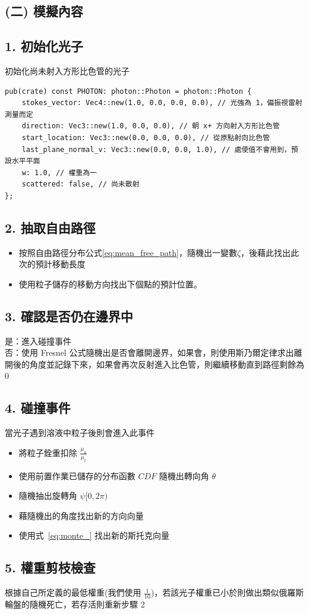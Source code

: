 \subsection*{(二) 模擬內容}
\subsection*{1. 初始化光子}
初始化尚未射入方形比色管的光子

\begin{verbatim}
pub(crate) const PHOTON: photon::Photon = photon::Photon {
    stokes_vector: Vec4::new(1.0, 0.0, 0.0, 0.0), // 光強為 1，偏振視雷射測量而定
    direction: Vec3::new(1.0, 0.0, 0.0), // 朝 x+ 方向射入方形比色管
    start_location: Vec3::new(0.0, 0.0, 0.0), // 從原點射向比色管
    last_plane_normal_v: Vec3::new(0.0, 0.0, 1.0), // 處使值不會用到，預設水平平面
    w: 1.0, // 權重為一
    scattered: false, // 尚未散射
};
\end{verbatim}

\subsection*{2. 抽取自由路徑}
\begin{itemize}
    \item[(1)] 按照自由路徑分布公式\eqref{eq:mean_free_path}，隨機出一變數$\zeta$，後藉此找出此次的預計移動長度
    \item[(2)] 使用粒子儲存的移動方向找出下個點的預計位置。
\end{itemize}

\subsection*{3. 確認是否仍在邊界中}
\noindent 是：進入碰撞事件\\
否：使用 Fresnel 公式隨機出是否會離開邊界，如果會，則使用斯乃爾定律求出離開後的角度並記錄下來，如果會再次反射進入比色管，則繼續移動直到路徑剩餘為 0

\subsection*{4. 碰撞事件}
當光子遇到溶液中粒子後則會進入此事件
\begin{itemize}
    \item[(1)] 將粒子銓重扣除 $\frac{\mu_a}{\mu_t}$
    \item[(2)] 使用前置作業已儲存的分布函數 $CDF$ 隨機出轉向角 $\theta$
    \item[(3)] 隨機抽出旋轉角 $\psi [0, 2\pi)$
    \item[(4)] 藉隨機出的角度找出新的方向向量
    \item[(5)] 使用式~\eqref{eq:monte_} 找出新的斯托克向量
\end{itemize}

\subsection*{5. 權重剪枝檢查}
根據自己所定義的最低權重(我們使用 $\frac{1}{10}$)，若該光子權重已小於則做出類似俄羅斯輪盤的隨機死亡，若存活則重新步驟 2
